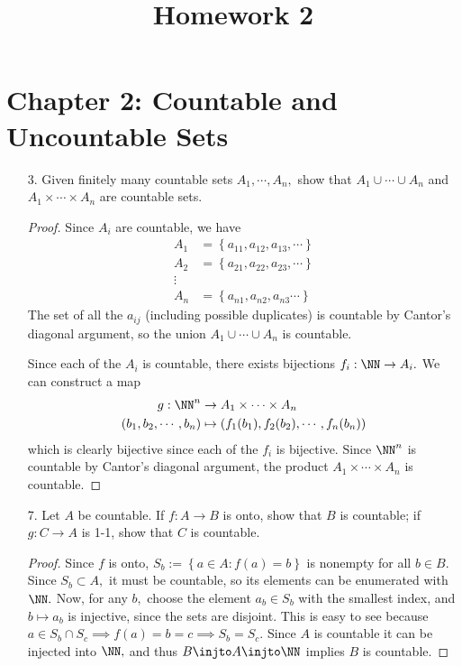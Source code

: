 \documentclass{article}
\begin{document}
\title{Homework 2}
\maketitle
\thispagestyle{fancy}

\section*{Chapter 2: Countable and Uncountable Sets}

\begin{itemize}
	\item[3.] Given finitely many countable sets $A_1, \cdots, A_n,$ show that $A_1\cup\cdots\cup A_n$ and $A_1\times\cdots\times A_n$ are countable sets.
		\begin{proof}
			Since $A_i$ are countable, we have
			\begin{align*}
				A_1 &= \left\{ a_{11}, a_{12}, a_{13}, \cdots \right\} \\
				A_2 &= \left\{ a_{21}, a_{22}, a_{23}, \cdots \right\} \\
				\vdots \\
				A_n &= \left\{ a_{n1}, a_{n2}, a_{n3}\cdots \right\}
			\end{align*}
			The set of all the $a_{ij}$ (including possible duplicates) is countable by Cantor's diagonal argument, so the union $A_1\cup\cdots\cup A_n$ is countable.

			Since each of the $A_i$ is countable, there exists bijections $f_i:\NN\to A_i.$ We can construct a map 
			\begin{align*}
				g:\NN^n &\to A_1\times\cdots\times A_n \\
				(b_1, b_2, \cdots, b_n) &\mapsto (f_1(b_1), f_2(b_2), \cdots, f_n(b_n))
			\end{align*}
			which is clearly bijective since each of the $f_i$ is bijective. Since $\NN^n$ is countable by Cantor's diagonal argument, the product $A_1\times\cdots\times A_n$ is countable.
		\end{proof}

	\item[7.] Let $A$ be countable. If $f:A\to B$ is onto, show that $B$ is countable; if $g:C\to A$ is 1-1, show that $C$ is countable.
		\begin{proof}
			Since $f$ is onto, $S_b:=\left\{ a\in A:f(a)=b \right\}$ is nonempty for all $b\in B.$ Since $S_b\subset A,$ it must be countable, so its elements can be enumerated with $\NN.$ Now, for any $b,$ choose the element $a_b\in S_b$ with the smallest index, and $b\mapsto a_b$ is injective, since the sets are disjoint. This is easy to see because $a\in S_b\cap S_c\implies f(a)=b=c\implies S_b=S_c.$ Since $A$ is countable it can be injected into $\NN,$ and thus $B\injto A\injto \NN$ implies $B$ is countable.


\end{proof}
\end{itemize}
\end{document}

